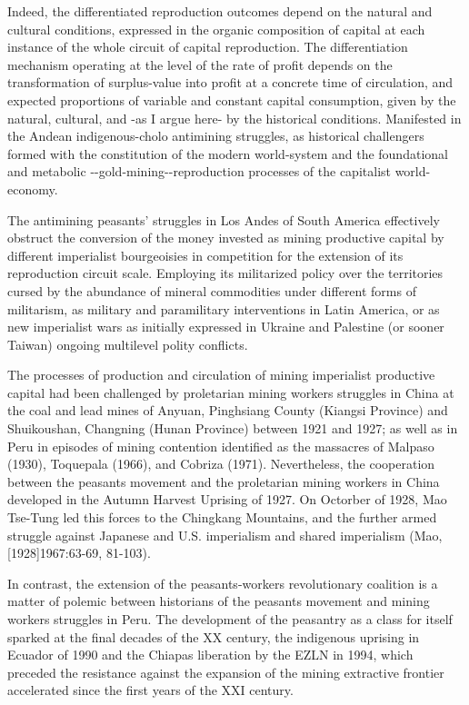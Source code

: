 \documentclass[
]{article}
\begin{document}
Indeed, the differentiated reproduction outcomes depend on the natural
and cultural conditions, expressed in the organic composition of capital
at each instance of the whole circuit of capital reproduction. The
differentiation mechanism operating at the level of the rate of profit
depends on the transformation of surplus-value into profit at a concrete
time of circulation, and expected proportions of variable and constant
capital consumption, given by the natural, cultural, and -as I argue
here- by the historical conditions. Manifested in the Andean
indigenous-cholo antimining struggles, as historical challengers formed
with the constitution of the modern world-system and the foundational
and metabolic -\/-gold-mining-\/-reproduction processes of the
capitalist world-economy.

The antimining peasants' struggles in Los Andes of South America
effectively obstruct the conversion of the money invested as mining
productive capital by different imperialist bourgeoisies in competition
for the extension of its reproduction circuit scale. Employing its
militarized policy over the territories cursed by the abundance of
mineral commodities under different forms of militarism, as military and
paramilitary interventions in Latin America, or as new imperialist wars
as initially expressed in Ukraine and Palestine (or sooner Taiwan)
ongoing multilevel polity conflicts.

The processes of production and circulation of mining imperialist
productive capital had been challenged by proletarian mining
workers\textquotesingle{} struggles in China at the coal and lead mines
of Anyuan, Pinghsiang County (Kiangsi Province) and Shuikoushan,
Changning (Hunan Province) between 1921 and 1927; as well as in Peru in
episodes of mining contention identified as the massacres of Malpaso
(1930), Toquepala (1966), and Cobriza (1971). Nevertheless, the
cooperation between the peasants\textquotesingle{} movement and the
proletarian mining workers in China developed in the Autumn Harvest
Uprising of 1927. On Octorber of 1928, Mao Tse-Tung led this forces to
the Chingkang Mountains, and the further armed struggle against Japanese
and U.S. imperialism and shared imperialism (Mao, {[}1928{]}1967:63-69,
81-103).

In contrast, the extension of the peasants-workers revolutionary
coalition is a matter of polemic between historians of the
peasants\textquotesingle{} movement and mining worker\textquotesingle s
struggles in Peru. The development of the peasantry as a class for
itself sparked at the final decades of the XX century, the indigenous
uprising in Ecuador of 1990 and the Chiapas liberation by the EZLN in
1994, which preceded the resistance against the expansion of the mining
extractive frontier accelerated since the first years of the XXI
century.
\end{document}
